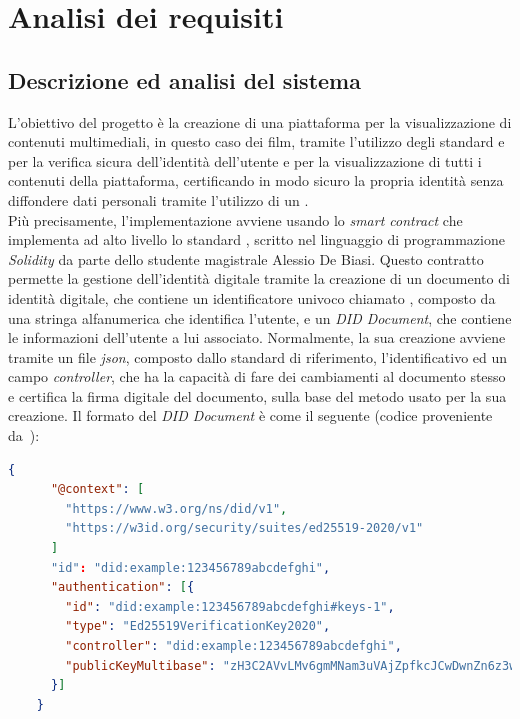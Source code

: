 \chapter{Analisi dei requisiti}\label{cap:analisi-requisiti}


\section{Descrizione ed analisi del sistema}\label{sec:analisi-sistema}
L'obiettivo del progetto è la creazione di una piattaforma per la visualizzazione di contenuti multimediali, in questo caso dei film,
tramite l'utilizzo degli standard   e  per la verifica sicura dell'identità dell'utente e per la 
visualizzazione di tutti i contenuti della piattaforma, certificando in modo sicuro la propria identità senza diffondere dati personali tramite 
l'utilizzo di un .\\

Più precisamente, l'implementazione avviene usando lo \textit{smart contract} che implementa ad alto livello lo standard , 
scritto nel linguaggio di programmazione \textit{Solidity} da parte dello studente magistrale Alessio De Biasi.
Questo contratto permette la gestione dell'identità digitale tramite la creazione di un documento di identità digitale, che contiene un identificatore univoco
chiamato , composto da una stringa alfanumerica che identifica l'utente, e un \textit{DID Document}, che contiene le informazioni dell'utente a lui associato.
Normalmente, la sua creazione avviene tramite un file \textit{json}, composto dallo standard di riferimento, l'identificativo ed un campo \textit{controller},
che ha la capacità di fare dei cambiamenti al documento stesso e certifica la firma digitale del documento, sulla base del metodo usato per la sua creazione.
Il formato del \textit{DID Document} è come il seguente (codice proveniente da~\cite{site:didw3c}):

\begin{lstlisting}[language=json]
    {
      "@context": [
        "https://www.w3.org/ns/did/v1",
        "https://w3id.org/security/suites/ed25519-2020/v1"
      ]
      "id": "did:example:123456789abcdefghi",
      "authentication": [{    
        "id": "did:example:123456789abcdefghi#keys-1",
        "type": "Ed25519VerificationKey2020",
        "controller": "did:example:123456789abcdefghi",
        "publicKeyMultibase": "zH3C2AVvLMv6gmMNam3uVAjZpfkcJCwDwnZn6z3wXmqPV"
      }]
    }
\end{lstlisting}

